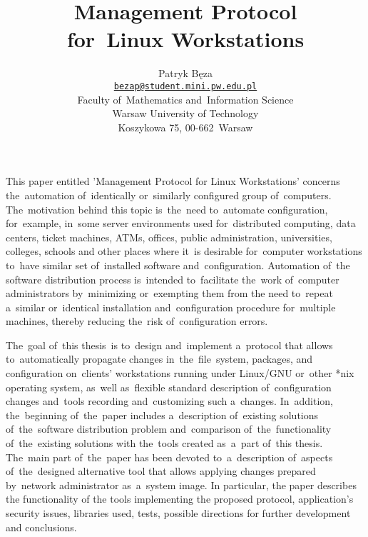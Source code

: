 \documentclass[12pt,a4paper]{article}
\begin{document}
\thispagestyle{empty}
\title{\textbf{Management Protocol\\for~Linux Workstations}}
\author{Patryk Bęza\\[-8pt]
\small \texttt{\href{mailto:bezap@student.mini.pw.edu.pl}{bezap@student.mini.pw.edu.pl}}\\[6pt]
\small Faculty of~Mathematics and~Information Science\\[-8pt]
\small Warsaw University of Technology\\[-8pt]
\small Koszykowa 75, 00-662~Warsaw
}
\date{}
\maketitle\thispagestyle{empty}

This paper entitled 'Management Protocol for Linux Workstations' concerns the~automation of~identically or~similarly configured group of~computers. The~motivation behind this topic is~the~need to~automate configuration, for~example, in~some server environments used for~distributed computing, data centers, ticket machines, ATMs, offices, public administration, universities, colleges, schools and other places where it~is desirable for~computer workstations to~have similar set of~installed software and~configuration. Automation of~the software distribution process is~intended to~facilitate the~work of~computer administrators by~minimizing or~exempting them from the need to~repeat a~similar or~identical installation and~configuration procedure for~multiple machines, thereby reducing the~risk of~configuration errors.

The~goal of~this thesis~is to~design and~implement a~protocol that allows to~automatically propagate changes in~the~file~system, packages, and configuration on~clients' workstations running under Linux/GNU or~other *nix operating system, as~well as~flexible standard description of~configuration changes and~tools recording and~customizing such a~changes. In~addition, the~beginning of~the~paper includes a~description of~existing solutions of~the~software distribution problem and~comparison of~the~functionality of~the~existing solutions with the~tools created as~a~part of~this thesis. The~main part of~the~paper has been devoted to~a~description of~aspects of~the~designed alternative tool that allows applying changes prepared by~network administrator as~a~system image. In particular, the paper describes the functionality of the tools implementing the proposed protocol, application's security issues, libraries used, tests, possible directions for further development and conclusions.
\end{document}
